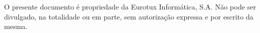 O presente documento é propriedade da Eurotux Informática, S.A. Não pode ser divulgado, na totalidade ou em parte, sem autorização expressa e por escrito da mesma.
